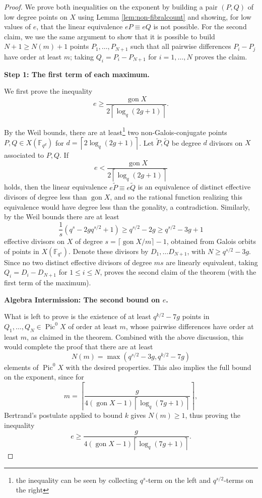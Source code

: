 \documentclass[11pt]{amsart}
\newcommand{\F}{\mathbb{F}}
\DeclareMathOperator{\Pic}{Pic}
\newcommand{\gon}{\operatorname{gon}}
\theoremstyle{definition}
\theoremstyle{remark}
\begin{document}
\begin{proof} We prove both inequalities on the exponent by building a pair $(P,Q)$ of low degree points on $X$ using Lemma \ref{lem:non-fibralcount} and showing, for low values of $e$, that the linear equivalence $eP \equiv eQ$ is not possible. For the second claim, we use the same argument to show that it is possible to build $N+1\geqslant N(m)+1$ points $P_1, \dots, P_{N+1}$ such that all pairwise differences $P_i-P_j$ have order at least $m$; taking $Q_i=P_i-P_{N+1}$ for $i=1,\dots, N$ proves the claim.
 
\noindent \textbf{Step 1: The first term of each maximum.}

We first prove the inequality \[e \geqslant \frac{\gon X}{2 \left\lceil\log_q(2g+1)\right\rceil}.\]

By the Weil bounds, there are at least\footnote{the inequality can be seen by collecting $q^{s}$-term on the left and $q^{s/2}$-terms on the right} two non-Galois-conjugate points $P,Q \in X(\F_{q^d})$ for  $d=\left\lceil 2\log_q(2g+1)\right\rceil$. Let $\tilde{P}, \tilde{Q}$ be degree $d$ divisors on $X$ associated to $P, Q$. If \[e < \dfrac{\gon X}{2\left\lceil \log_q(2g+1)\right\rceil}\] holds, then the linear equivalence $e\tilde{P} \equiv e\tilde{Q}$ is an equivalence of distinct effective divisors of degree less than $\gon X$, and so the rational function realizing this equivalence would have degree less than the gonality, a contradiction. Similarly, by the Weil bounds there are at least 
\[\frac{1}{s}\left(q^s-2gq^{s/2}+1\right)\geqslant q^{s/2} - 2g\geqslant q^{s/2}-3g+1 \]
effective divisors on $X$ of degree $s=\lceil \gon X/m\rceil-1$, obtained from Galois orbits of points in $X(\F_{q^s})$. Denote these divisors by $D_1, \dots D_{N+1}$, with $N\geqslant q^{s/2}-3g$.  Since no two distinct effective divisors of degree $ms$ are linearly equivalent, taking $Q_i=D_i-D_{N+1}$ for $1\leqslant i \leqslant N$, proves the second claim of the theorem (with the first term of the maximum).  

\noindent\textbf{Algebra Intermission:  The second bound on $e$. }

What is left to prove is the existence of at least  
$ q^{k/2} -7g  $ 
points in $Q_1, \dots, Q_N\in \Pic^0X$ of order at least $m$, whose pairwise differences have order at least $m$, as claimed in the theorem. Combined with the above discussion, this would complete the proof that there are at least 
\[N(m) = \max \left(q^{s/2} - 3g, q^{k/2}-7g   \right)\]
elements of $\Pic^0 X$ with the desired properties. This also implies the full bound on the exponent, since  for \[m = \left\lceil \frac{g}{4(\gon X - 1)\left\lceil\log_q(7g+1)\right\rceil} \right \rceil, \]  Bertrand's postulate applied to bound $k$ gives $N(m)\geqslant 1$, thus proving the inequality \[e \geqslant  \frac{g}{4(\gon X - 1)\left\lceil\log_q(7g+1)\right\rceil}. \]


\end{proof}
\end{document}
